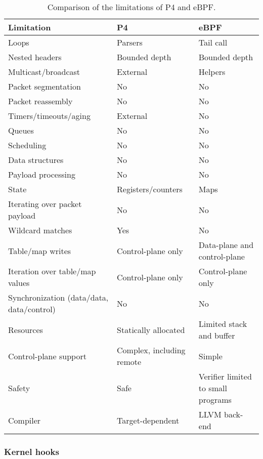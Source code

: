 \begin{table*}[t]
	\footnotesize
	\begin{center}
		\begin{tabular}{|l|l|l|} \hline
			\textbf{Limitation} & \textbf{P4} & \textbf{eBPF} \\ \hline \hline
			Loops & Parsers & Tail call \\ \hline
			Nested headers & Bounded depth & Bounded depth \\ \hline
			Multicast/broadcast & External & Helpers \\ \hline
			Packet segmentation & No & No \\ \hline
			Packet reassembly &	No & No \\ \hline
			Timers/timeouts/aging & External & No \\ \hline
			Queues & No & No \\ \hline
			Scheduling & No & No \\ \hline
			Data structures & No & No \\ \hline
			Payload processing & No & No \\ \hline
			State & Registers/counters & Maps \\ \hline
			Iterating over packet payload & No & No \\ \hline
			Wildcard matches & Yes & No \\ \hline
			Table/map writes & Control-plane only & Data-plane and 
			control-plane \\ \hline
			Iteration over table/map values & Control-plane only & 
			Control-plane only \\ \hline
			Synchronization (data/data, data/control)  & No & No \\ \hline
			Resources & Statically allocated & Limited stack and buffer \\ 
			\hline
			Control-plane support & Complex, including remote & Simple \\ \hline
			Safety & Safe & Verifier limited to small programs \\ \hline
			Compiler & Target-dependent & LLVM back-end \\ \hline
		\end{tabular}
		\caption{Comparison of the limitations of P4 and
			eBPF.}\label{table:limitations}
	\end{center}
\end{table*}

\subsubsection{Kernel hooks}

